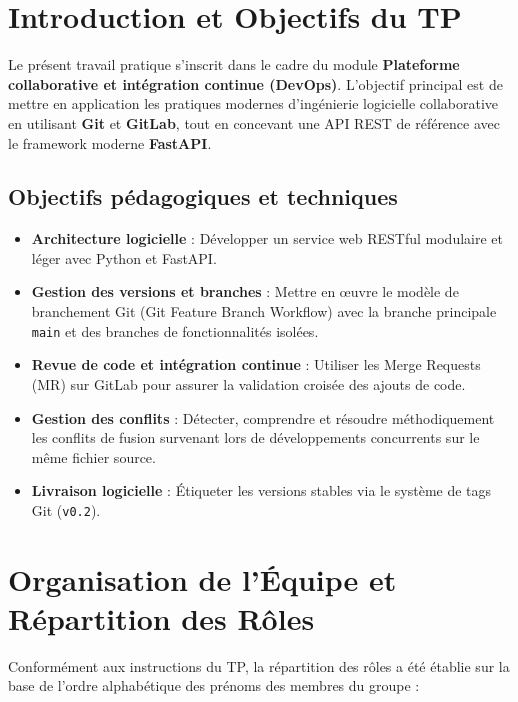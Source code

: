 \documentclass[a4paper,12pt]{article}
\begin{document}
\section{Introduction et Objectifs du TP}

Le présent travail pratique s'inscrit dans le cadre du module \textbf{Plateforme collaborative et intégration continue (DevOps)}. L'objectif principal est de mettre en application les pratiques modernes d'ingénierie logicielle collaborative en utilisant \textbf{Git} et \textbf{GitLab}, tout en concevant une API REST de référence avec le framework moderne \textbf{FastAPI}.

\subsection{Objectifs pédagogiques et techniques}
\begin{itemize}
    \item \textbf{Architecture logicielle} : Développer un service web RESTful modulaire et léger avec Python et FastAPI.
    \item \textbf{Gestion des versions et branches} : Mettre en œuvre le modèle de branchement Git (Git Feature Branch Workflow) avec la branche principale \texttt{main} et des branches de fonctionnalités isolées.
    \item \textbf{Revue de code et intégration continue} : Utiliser les Merge Requests (MR) sur GitLab pour assurer la validation croisée des ajouts de code.
    \item \textbf{Gestion des conflits} : Détecter, comprendre et résoudre méthodiquement les conflits de fusion survenant lors de développements concurrents sur le même fichier source.
    \item \textbf{Livraison logicielle} : Étiqueter les versions stables via le système de tags Git (\texttt{v0.2}).
\end{itemize}

\section{Organisation de l'Équipe et Répartition des Rôles}

Conformément aux instructions du TP, la répartition des rôles a été établie sur la base de l'ordre alphabétique des prénoms des membres du groupe :
\end{document}
